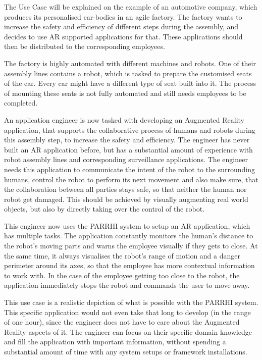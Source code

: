 The Use Case will be explained on the example of an automotive company, which produces its personalised car-bodies in an agile factory. The factory wants to increase the safety and efficiency of different steps during the assembly, and decides to use AR supported applications for that. These applications should then be distributed to the corresponding employees.

The factory is highly automated with different machines and robots. One of their assembly lines contains a robot, which is tasked to prepare the customised seats of the car. Every car might have a different type of seat built into it. The process of mounting these seats is not fully automated and still needs employees to be completed.

An application engineer is now tasked with developing an Augmented Reality application, that supports the collaborative process of humans and robots during this assembly step, to increase the safety and efficiency. The engineer has never built an AR application before, but has a substantial amount of experience with robot assembly lines and corresponding surveillance applications. The engineer needs this application to communicate the intent of the robot to the surrounding humans, control the robot to perform its next movement and also make sure, that the collaboration between all parties stays safe, so that neither the human nor robot get damaged. This should be achieved by visually augmenting real world objects, but also by directly taking over the control of the robot.

This engineer now uses the PARRHI system to setup an AR application, which has multiple tasks. The application constantly monitors the human's distance to the robot's moving parts and warns the employee visually if they gets to close. At the same time, it always visualises the robot's range of motion and a danger perimeter around its axes, so that the employee has more contextual information to work with. In the case of the employee getting too close to the robot, the application immediately stops the robot and commands the user to move away.

This use case is a realistic depiction of what is possible with the PARRHI system. This specific application would not even take that long to develop (in the range of one hour), since the engineer does not have to care about the Augmented Reality aspects of it. The engineer can focus on their specific domain knowledge and fill the application with important information, without spending a substantial amount of time with any system setups or framework installations.

